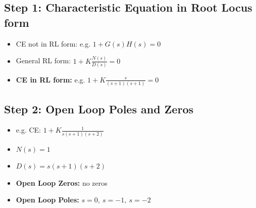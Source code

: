 \documentclass[a4paper]{article}
\begin{document}
\subsection{Step 1: Characteristic Equation in Root Locus form}
\begin{itemize}
    \item CE not in RL form: e.g. $1+G(s)H(s) = 0$
    \item General RL form: $1+K\displaystyle\frac{N(s)}{D(s)} = 0$
    \item \textbf{CE in RL form:} e.g. $1+K\displaystyle\frac{s}{(s+1)(s+1)} = 0$
\end{itemize}

\subsection{Step 2: Open Loop Poles and Zeros}
\begin{itemize}
    \item e.g. CE: $1+K\displaystyle\frac{1}{s(s+1)(s+2)}$
    \item $N(s) = 1$
    \item $D(s) = s(s+1)(s+2)$
    \item \textbf{Open Loop Zeros:} no zeros
    \item \textbf{Open Loop Poles:} $s = 0,\ s = -1,\ s = -2$
\end{itemize}
\end{document}
